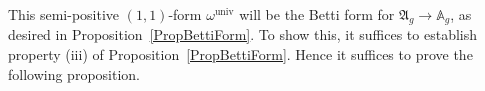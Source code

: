 
This semi-positive $(1,1)$-form $\omega^{\mathrm{univ}}$ will be the Betti form for $\mathfrak{A}_g \rightarrow \mathbb A_g$, as desired in Proposition~\ref{PropBettiForm}. To show this, it suffices to establish property (iii) of Proposition~\ref{PropBettiForm}. Hence it suffices to prove the following proposition. %

